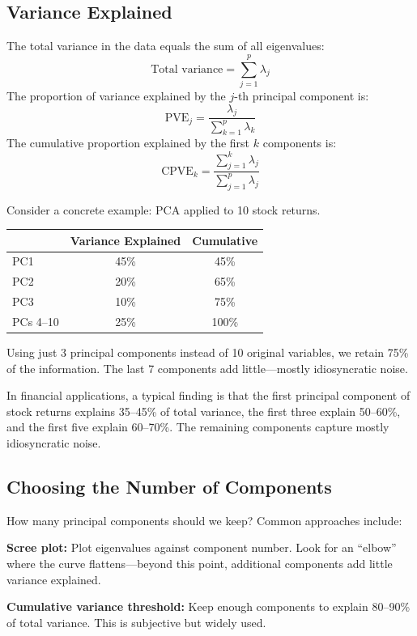 \documentclass[11pt,a4paper]{article}
\begin{document}
\subsection{Variance Explained}

The total variance in the data equals the sum of all eigenvalues:
\[
\text{Total variance} = \sum_{j=1}^{p} \lambda_j
\]
The proportion of variance explained by the $j$-th principal component is:
\[
\text{PVE}_j = \frac{\lambda_j}{\sum_{k=1}^{p} \lambda_k}
\]
The cumulative proportion explained by the first $k$ components is:
\[
\text{CPVE}_k = \frac{\sum_{j=1}^{k} \lambda_j}{\sum_{j=1}^{p} \lambda_j}
\]

Consider a concrete example: PCA applied to 10 stock returns.

\begin{center}
\begin{tabular}{lcc}
\toprule
& \textbf{Variance Explained} & \textbf{Cumulative} \\
\midrule
PC1 & 45\% & 45\% \\
PC2 & 20\% & 65\% \\
PC3 & 10\% & 75\% \\
PCs 4--10 & 25\% & 100\% \\
\bottomrule
\end{tabular}
\end{center}

Using just 3 principal components instead of 10 original variables, we retain 75\% of the information. The last 7 components add little---mostly idiosyncratic noise.

In financial applications, a typical finding is that the first principal component of stock returns explains 35--45\% of total variance, the first three explain 50--60\%, and the first five explain 60--70\%. The remaining components capture mostly idiosyncratic noise.

\subsection{Choosing the Number of Components}

How many principal components should we keep? Common approaches include:

\textbf{Scree plot:} Plot eigenvalues against component number. Look for an ``elbow'' where the curve flattens---beyond this point, additional components add little variance explained.

\textbf{Cumulative variance threshold:} Keep enough components to explain 80--90\% of total variance. This is subjective but widely used.
\end{document}
